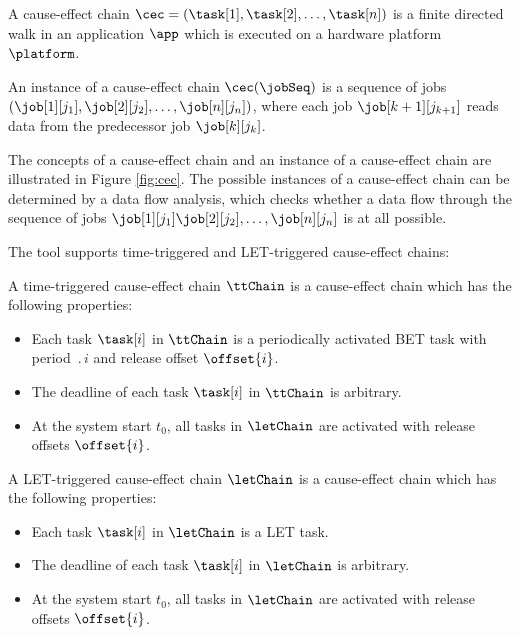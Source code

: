 \begin{definition}
A cause-effect chain  
$\cec=(\task[1], \task[2], \ldots, \task[n])$ 
is a finite directed walk in an application $\app$ which is executed on a hardware platform $\platform$.
\end{definition}
\bigskip

\begin{definition}
An instance of a cause-effect chain $\cec(\jobSeq)$ 
is a sequence of jobs
$\left(\job[1][j_1], \job[2][j_2], \ldots, \job[n][j_n]\right)$, where each job $\job[{k+1}][j_{k+1}]$ reads data from the predecessor job $\job[k][j_{k}]$.
\end{definition}
%
The concepts of a cause-effect chain and an instance of a cause-effect chain are illustrated in Figure \ref{fig:cec}.
The possible instances of a cause-effect chain can be determined by a data flow analysis, which checks whether a data flow through the sequence of jobs $\job[1][j_1] \job[2][j_2], \ldots, \job[n][j_n]$ is at all possible.
\bigskip

The tool \Tool supports time-triggered and LET-triggered cause-effect chains:

\begin{definition}
A time-triggered cause-effect chain 
$\ttChain$ is a cause-effect chain which has the following properties: 
\begin{itemize}[leftmargin=*,itemsep=0pt]
	\item Each task $\task[i]$ in $\ttChain$ is a periodically activated BET task with period $\period{i}$ and release offset $\offset{i}$. 
	\item The deadline of each task $\task[i]$ in $\ttChain$ is arbitrary. 
	\item At the system start $t_0$, all tasks in $\letChain$ are activated with release offsets $\offset{i}$.
\end{itemize}
\end{definition}

\begin{definition}
A LET-triggered cause-effect chain $\letChain$ 
is a cause-effect chain which has the following properties: 
\begin{itemize}[leftmargin=*,itemsep=0pt]
	\item Each task $\task[i]$ in $\letChain$ is a LET task.
	\item The deadline of each task $\task[i]$ in $\letChain$ is arbitrary.
	\item At the system start $t_0$, all tasks in $\letChain$ are activated with release offsets $\offset{i}$.
\end{itemize}
\end{definition}

